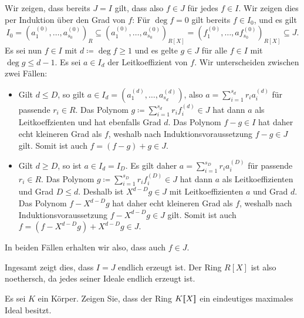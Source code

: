 \begin{question}
  Wir zeigen, dass bereits $J = I$ gilt, dass also $f \in J$ für jedes $f \in I$.
  Wir zeigen dies per Induktion über den Grad von $f$:
  Für $\deg f = 0$ gilt bereits $f\in I_0$, und es gilt
  \[
              I_0
    =         (a^{(0)}_1, \dotsc, a^{(0)}_{s_0})_R
    \subseteq (a^{(0)}_1, \dotsc, a^{(0)}_{s_0})_{R[X]}
    =         (f^{(0)}_1, \dotsc, af^{(0)}_{s_0})_{R[X]}
    \subseteq J.
  \]
  Es sei nun $f \in I$ mit $d \coloneqq \deg f \geq 1$ und es gelte $g \in J$ für alle $f \in I$ mit $\deg g \leq d-1$.
  Es sei $a \in I_d$ der Leitkoeffizient von $f$.
  Wir unterscheiden zwischen zwei Fällen:
  \begin{itemize}
    \item
      Gilt $d \leq D$, so gilt $a \in I_d = (a^{(d)}_1, \dotsc, a^{(d)}_{s_d})$, also $a = \sum_{i=1}^{s_d} r_i a^{(d)}_i$ für passende $r_i \in R$.
      Das Polynom $g \coloneqq \sum_{i=1}^{s_d} r_i f^{(d)}_i \in J$ hat dann $a$ als Leitkoeffzienten und hat ebenfalls Grad $d$.
      Das Polynom $f - g \in I$ hat daher echt kleineren Grad als $f$, weshalb nach Induktionsvoraussetzung $f - g \in J$ gilt.
      Somit ist auch $f = (f - g) + g \in J$.
    \item
      Gilt $d \geq D$, so ist $a \in I_d = I_D$.
      Es gilt daher $a = \sum_{i=1}^{s_D} r_i a^{(D)}_i$ für passende $r_i \in R$.
      Das Polynom $g \coloneqq \sum_{i=1}^{s_D} r_i f^{(D)}_i \in J$ hat dann $a$ als Leitkoeffizienten und Grad $D \leq d$.
      Deshalb ist $X^{d-D} g \in J$ mit Leitkoeffizienten $a$ und Grad $d$.
      Das Polynom $f - X^{d-D} g$ hat daher echt kleineren Grad als $f$, weshalb nach Induktionsvoraussetzung $f - X^{d-D} g \in J$ gilt.
      Somit ist auch $f = (f - X^{d-D} g) + X^{d-D} g \in J$.
  \end{itemize}
  In beiden Fällen erhalten wir also, dass auch $f \in J$.
  
  Ingesamt zeigt dies, dass $I = J$ endlich erzeugt ist.
  Der Ring $R[X]$ ist also noethersch, da jedes seiner Ideale endlich erzeugt ist.
\end{question}


\begin{question}[subtitle = $\powerseries{K}{X}$ ist lokal]
  Es sei $K$ ein Körper.
  Zeigen Sie, dass der Ring $\powerseries{K}{X}$ ein eindeutiges maximales Ideal besitzt.
\end{question}



